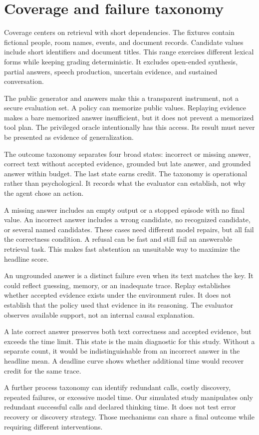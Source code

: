 \documentclass{article}
\begin{document}
\section{Coverage and failure taxonomy}
Coverage centers on retrieval with short dependencies. The fixtures contain fictional people, room names, events, and document records. Candidate values include short identifiers and document titles. This range exercises different lexical forms while keeping grading deterministic. It excludes open-ended synthesis, partial answers, speech production, uncertain evidence, and sustained conversation.\par
The public generator and answers make this a transparent instrument, not a secure evaluation set. A policy can memorize public values. Replaying evidence makes a bare memorized answer insufficient, but it does not prevent a memorized tool plan. The privileged oracle intentionally has this access. Its result must never be presented as evidence of generalization.\par
The outcome taxonomy separates four broad states: incorrect or missing answer, correct text without accepted evidence, grounded but late answer, and grounded answer within budget. The last state earns credit. The taxonomy is operational rather than psychological. It records what the evaluator can establish, not why the agent chose an action.\par
A missing answer includes an empty output or a stopped episode with no final value. An incorrect answer includes a wrong candidate, no recognized candidate, or several named candidates. These cases need different model repairs, but all fail the correctness condition. A refusal can be fast and still fail an answerable retrieval task. This makes fast abstention an unsuitable way to maximize the headline score.\par
An ungrounded answer is a distinct failure even when its text matches the key. It could reflect guessing, memory, or an inadequate trace. Replay establishes whether accepted evidence exists under the environment rules. It does not establish that the policy used that evidence in its reasoning. The evaluator observes available support, not an internal causal explanation.\par
A late correct answer preserves both text correctness and accepted evidence, but exceeds the time limit. This state is the main diagnostic for this study. Without a separate count, it would be indistinguishable from an incorrect answer in the headline mean. A deadline curve shows whether additional time would recover credit for the same trace.\par
A further process taxonomy can identify redundant calls, costly discovery, repeated failures, or excessive model time. Our simulated study manipulates only redundant successful calls and declared thinking time. It does not test error recovery or discovery strategy. Those mechanisms can share a final outcome while requiring different interventions.\par
\end{document}
